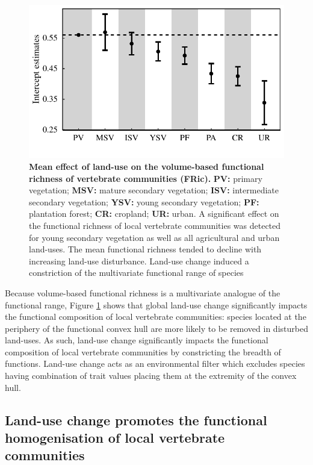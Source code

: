 \begin{figure}[h!]
\centering
\includegraphics[scale=0.70]{figures/chapter3/FRic/Mean_effect_LU}
\caption[Mean effect of land-use on the volume-based functional richness of vertebrate communities (FRic)]{\textbf{Mean effect of land-use on the volume-based functional richness of vertebrate communities (FRic).} \textbf{PV:} primary vegetation; \textbf{MSV:} mature secondary vegetation; \textbf{ISV:} intermediate secondary vegetation; \textbf{YSV:} young secondary vegetation; \textbf{PF:} plantation forest; \textbf{CR:} cropland; \textbf{UR:} urban. A significant effect on the functional richness of local vertebrate communities was detected for young secondary vegetation as well as all agricultural and urban land-uses. The mean functional richness tended to decline with increasing land-use disturbance. Land-use change induced a constriction of the multivariate functional range of species}
\label{LU_mean_FRic}
\end{figure}

Because volume-based functional richness is a multivariate analogue of the functional range, Figure \ref{LU_mean_FRic} shows that global land-use change significantly impacts the functional composition of local vertebrate communities: species located at the periphery of the functional convex hull are more likely to be removed in disturbed land-uses. As such, land-use change significantly impacts the functional composition of local vertebrate communities by constricting the breadth of functions. Land-use change acts as an environmental filter which excludes species having combination of trait values placing them at the extremity of the convex hull. 

\subsection{Land-use change promotes the functional homogenisation of local vertebrate communities}

